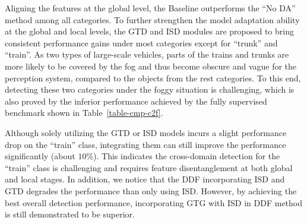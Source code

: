 \documentclass[journal]{IEEEtran}
\begin{document}
Aligning the features at the global level, the Baseline outperforms the ``No DA'' method among all categories. To further strengthen the model adaptation ability at the global and local levels, the GTD and ISD modules are proposed to bring consistent performance gains under most categories except for ``trunk'' and ``train''. As two types of large-scale vehicles, parts of the trains and trunks are more likely to be covered by the fog and thus become obscure and vague for the perception system, compared to the objects from the rest categories. To this end, detecting these two categories under the foggy situation is challenging, which is also proved by the inferior performance achieved by the fully supervised benchmark shown in Table~\ref{table-cmp-c2f}. 


Although solely utilizing the GTD or ISD models incurs a slight performance drop on the ``train'' class, integrating them can still improve the performance significantly (about $10\%$). This indicates the cross-domain detection for the ``train'' class is challenging and requires feature disentanglement at both global and local stages. In addition, we notice that the DDF incorporating ISD and GTD degrades the performance than only using ISD. However, by achieving the best overall detection performance, incorporating GTG with ISD in DDF method is still demonstrated to be superior.

{}
\end{document}

